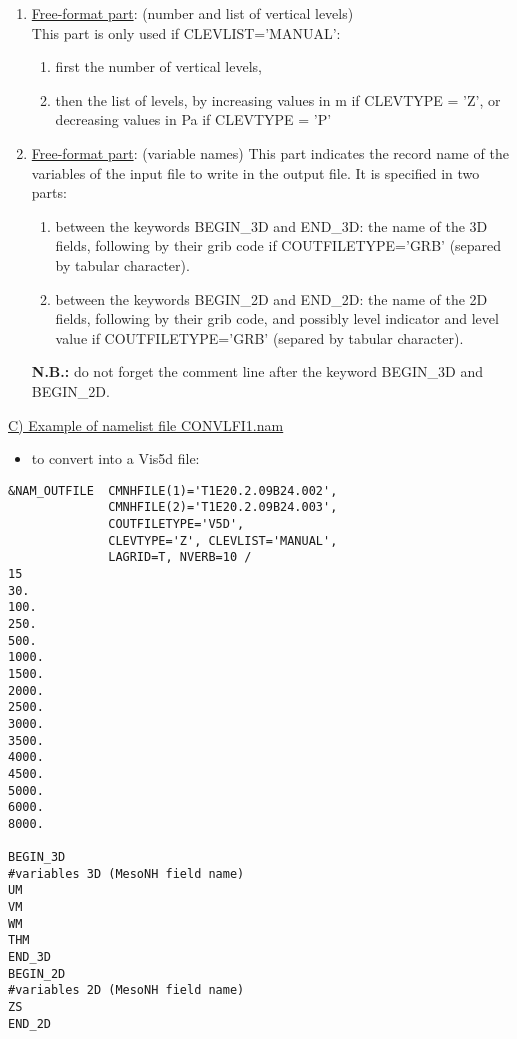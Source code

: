 \begin{enumerate}
\begin{itemize}
\end{itemize}

\item\underline{Free-format part}: (number and list of vertical levels) \\
This part is only used if CLEVLIST='MANUAL':
\begin{enumerate}
\item first the number of vertical levels,
\item then the list of levels, by increasing values in m if CLEVTYPE = 'Z', or decreasing
values in Pa if CLEVTYPE = 'P'
\end{enumerate}

\item\underline{Free-format part}: (variable names)
This part indicates the record name of the variables of the input file to
write in the output file. It is specified in two parts:
\begin{enumerate}
\item between the keywords BEGIN\_3D and END\_3D: the name of the 3D fields,
following by their grib code if COUTFILETYPE='GRB' (separed by tabular 
character).
\item between the keywords BEGIN\_2D and END\_2D: the name of the 2D fields,
following by their grib code, and possibly level indicator and level value
if COUTFILETYPE='GRB' (separed by tabular character).
\end{enumerate}
{\bf N.B.:} do not forget the comment line after the keyword BEGIN\_3D
and BEGIN\_2D.


\end{enumerate}

\underline{C) Example of namelist file CONVLFI1.nam}
\begin{itemize}
\item
to convert into a Vis5d file:
\end{itemize}

\begin{verbatim}
&NAM_OUTFILE  CMNHFILE(1)='T1E20.2.09B24.002',
              CMNHFILE(2)='T1E20.2.09B24.003',
              COUTFILETYPE='V5D',
              CLEVTYPE='Z', CLEVLIST='MANUAL',
              LAGRID=T, NVERB=10 /
15
30.
100.
250.
500.
1000.
1500.
2000.
2500.
3000.
3500.
4000.
4500.
5000.
6000.
8000.

BEGIN_3D
#variables 3D (MesoNH field name)
UM
VM
WM
THM
END_3D
BEGIN_2D
#variables 2D (MesoNH field name)
ZS
END_2D
\end{verbatim}

